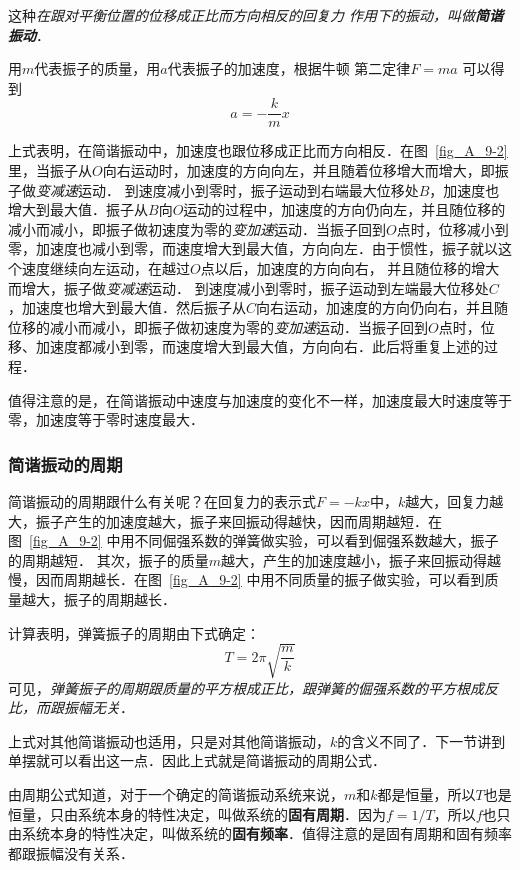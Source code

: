 这种\textit{在跟对平衡位置的位移成正比而方向相反的回复力
作用下的振动，叫做\textbf{简谐振动}}．

用$m$代表振子的质量，用$a$代表振子的加速度，根据牛顿
第二定律$F=ma$ 可以得到
\[a=-\frac{k}{m}x\]

上式表明，在简谐振动中，加速度也跟位移成正比而方向相反．在图~\ref{fig_A_9-2} 里，当振子从$O$向右运动时，加速度的方向向左，并且随着位移增大而增大，即振子做\textit{变减速}运动．
到速度减小到零时，振子运动到右端最大位移处$B$，加速度也增大到最大值．振子从$B$向$O$运动的过程中，加速度的方向仍向左，并且随位移的减小而减小，即振子做初速度为零的\textit{变加速}运动．当振子回到$O$点时，位移减小到零，加速度也减小到零，而速度增大到最大值，方向向左．由于惯性，振子就以这个速度继续向左运动，在越过$O$点以后，加速度的方向向右，
并且随位移的增大而增大，振子做\textit{变减速}运动．
到速度减小到零时，振子运动到左端最大位移处$C$，加速度也增大到最大值．然后振子从$C$向右运动，加速度的方向仍向右，并且随位移的减小而减小，即振子做初速度为零的\textit{变加速}运动．当振子回到$O$点时，位移、加速度都减小到零，而速度增大到最大值，方向向右．此后将重复上述的过程．

值得注意的是，在简谐振动中速度与加速度的变化不一样，加速度最大时速度等于零，加速度等于零时速度最大．

\subsubsection{简谐振动的周期}

简谐振动的周期跟什么有关呢？在回复力的表示式$F=-kx$中，$k$越大，回复力越大，振子产生的加速度越大，振子来回振动得越快，因而周期越短．在图~\ref{fig_A_9-2} 中用不同倔强系数的弹簧做实验，可以看到倔强系数越大，振子的周期越短．
其次，振子的质量$m$越大，产生的加速度越小，振子来回振动得越慢，因而周期越长．在图~\ref{fig_A_9-2} 中用不同质量的振子做实验，可以看到质量越大，振子的周期越长．

计算表明，弹簧振子的周期由下式确定：
\[T=2\pi\sqrt{\frac{m}{k}} \]
可见，\textit{弹簧振子的周期跟质量的平方根成正比，跟弹簧的倔强系数的平方根成反比，而跟振幅无关}．

上式对其他简谐振动也适用，只是对其他简谐振动，$k$的含义不同了．下一节讲到单摆就可以看出这一点．因此上式就是简谐振动的周期公式．

由周期公式知道，对于一个确定的简谐振动系统来说，$m$和$k$都是恒量，所以$T$也是恒量，只由系统本身的特性决定，叫做系统的\textbf{固有周期}．因为$f=1/T$，所以$f$也只由系统本身的特性决定，叫做系统的\textbf{固有频率}．值得注意的是固有周期和固有频率都跟振幅没有关系．
	
